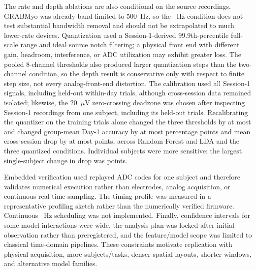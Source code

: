 \documentclass[preprint,12pt]{elsarticle}
\begin{document}
The rate and depth ablations are also conditional on the source recordings. GRABMyo was already band-limited to 500~Hz, so the \fsCommodity{}~Hz condition does not test substantial bandwidth removal and should not be extrapolated to much lower-rate devices. Quantization used a Session-1-derived 99.9th-percentile full-scale range and ideal source notch filtering; a physical front end with different gain, headroom, interference, or ADC utilization may exhibit greater loss. The pooled 8-channel thresholds also produced larger quantization steps than the two-channel condition, so the depth result is conservative only with respect to finite step size, not every analog-front-end distortion. The calibration used all Session-1 signals, including held-out within-day trials, although cross-session data remained isolated; likewise, the 20~$\mu$V zero-crossing deadzone was chosen after inspecting Session-1 recordings from one subject, including its held-out trials. Recalibrating the quantizer on the training trials alone changed the three thresholds by at most \vmaxSensThresholdShift{} and changed group-mean Day-1 accuracy by at most \vmaxSensDayOneMax{} percentage points and mean cross-session drop by at most \vmaxSensDropMax{} points, across Random Forest and LDA and the three quantized conditions. Individual subjects were more sensitive: the largest single-subject change in drop was \vmaxSensSubjectMax{} points.

Embedded verification used replayed ADC codes for one subject and therefore validates numerical execution rather than electrodes, analog acquisition, or continuous real-time sampling. The timing profile was measured in a representative profiling sketch rather than the numerically verified firmware. Continuous \fsCommodity{}~Hz scheduling was not implemented. Finally, confidence intervals for some model interactions were wide, the analysis plan was locked after initial observation rather than preregistered, and the feature/model scope was limited to classical time-domain pipelines. These constraints motivate replication with physical acquisition, more subjects/tasks, denser spatial layouts, shorter windows, and alternative model families.
\end{document}
